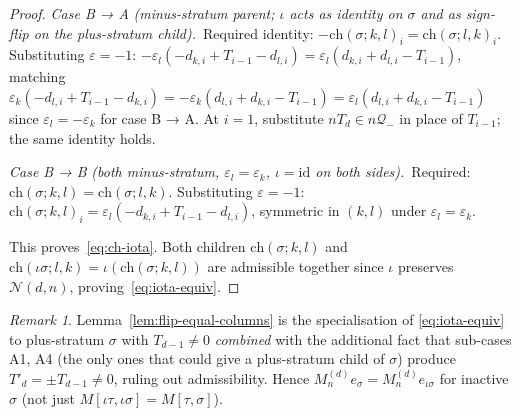 \documentclass{amsart}
\theoremstyle{definition}
\theoremstyle{remark}
\newtheorem{remark}[theorem]{Remark}
\begin{document}
\begin{proof}
\smallskip
\textit{Case B → A} \emph{(minus-stratum parent;
$\iota$ acts as identity on $\sigma$ and as sign-flip on the
plus-stratum child).}\
Required identity: $-\mathrm{ch}(\sigma; k, l)_i =
\mathrm{ch}(\sigma; l, k)_i$.  Substituting $\varepsilon = -1$:
$-\varepsilon_l(-d_{k, i} + T_{i-1} - d_{l, i})
= \varepsilon_l(d_{k, i} + d_{l, i} - T_{i-1})$, matching
$\varepsilon_k(-d_{l, i} + T_{i-1} - d_{k, i})
= -\varepsilon_k(d_{l, i} + d_{k, i} - T_{i-1})
= \varepsilon_l(d_{l, i} + d_{k, i} - T_{i-1})$ since
$\varepsilon_l = -\varepsilon_k$ for case B → A.  At $i = 1$,
substitute $n T_d \in n \mathcal{Q}_-$ in place of $T_{i-1}$;
the same identity holds.

\smallskip
\textit{Case B → B} \emph{(both minus-stratum,
$\varepsilon_l = \varepsilon_k$, $\iota = \mathrm{id}$ on both
sides).}\
Required: $\mathrm{ch}(\sigma; k, l) = \mathrm{ch}(\sigma; l, k)$.
Substituting $\varepsilon = -1$:
$\mathrm{ch}(\sigma; k, l)_i = \varepsilon_l(-d_{k, i} + T_{i-1}
- d_{l, i})$, symmetric in $(k, l)$ under
$\varepsilon_l = \varepsilon_k$.

\smallskip
This proves~\eqref{eq:ch-iota}.  Both children
$\mathrm{ch}(\sigma; k, l)$ and
$\mathrm{ch}(\iota\sigma; l, k) = \iota(\mathrm{ch}(\sigma; k, l))$
are admissible together since $\iota$ preserves $\mathcal{N}(d, n)$,
proving~\eqref{eq:iota-equiv}.
\end{proof}

\begin{remark}
Lemma~\ref{lem:flip-equal-columns} is the specialisation of
\eqref{eq:iota-equiv} to plus-stratum $\sigma$ with
$T_{d-1} \neq 0$ \emph{combined} with the additional fact that
sub-cases A1, A4 (the only ones that could give a plus-stratum
child of $\sigma$) produce $T'_d = \pm T_{d-1} \neq 0$,
ruling out admissibility.  Hence
$M_n^{(d)} e_\sigma = M_n^{(d)} e_{\iota\sigma}$ for inactive
$\sigma$ (not just $M[\iota \tau, \iota\sigma] = M[\tau, \sigma]$).
\end{remark}
\end{document}
